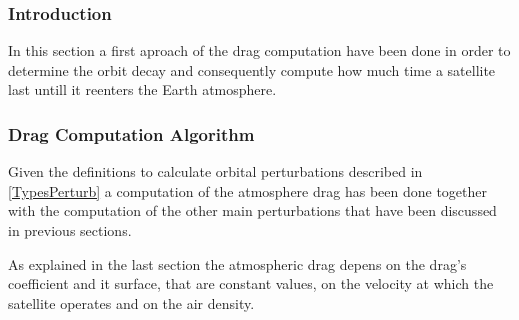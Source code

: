 \subsubsection{Introduction}

In this section a first aproach of the drag computation have been done in order to determine the orbit decay and consequently compute how much time a satellite last untill it reenters the Earth atmosphere.

\subsubsection{Drag Computation Algorithm}

Given the definitions to calculate orbital perturbations described in \ref{TypesPerturb} a computation of the atmosphere drag has been done together with the computation of the other main perturbations that have been discussed in previous sections.

As explained in the last section the atmospheric drag depens on the drag's coefficient and it surface, that are constant values, on the velocity at which the satellite operates and on the air density.

